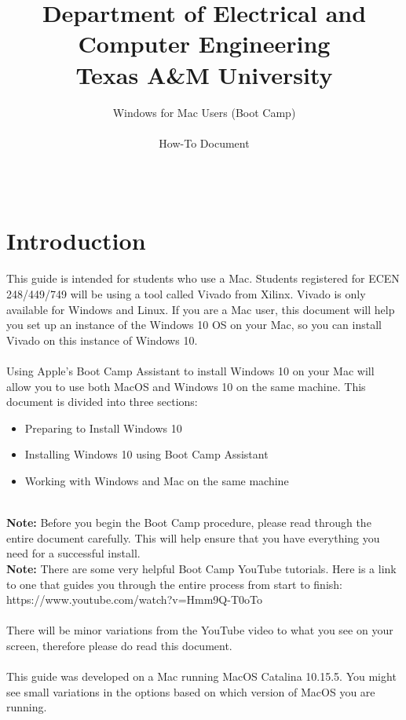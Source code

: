 \documentclass[11pt,twoside,titlepage]{article}
\title{ \huge Department of Electrical and Computer Engineering\\ \huge Texas A\&M University \\}
\author{ \huge Windows for Mac Users (Boot Camp)\\ \\ \huge How-To Document \\ \\ \\ \ta}
\date{}
\begin{document}

\maketitle

\section{Introduction}

This guide is intended for students who use a Mac. Students registered for ECEN 248/449/749 will be using a tool called Vivado from Xilinx. Vivado is only available for Windows and Linux. If you are a Mac user, this document will help you set up an instance of the Windows 10 OS on your Mac, so you can install Vivado on this instance of Windows 10.\\
\\
\noindent
Using Apple's Boot Camp Assistant to install Windows 10 on your Mac will allow you to use both MacOS and Windows 10 on the same machine. This document is divided into three sections: 
\begin{itemize}
    \item Preparing to Install Windows 10
    \item Installing Windows 10 using Boot Camp Assistant
    \item Working with Windows and Mac on the same machine
\end{itemize}

\\

\noindent
\textbf{Note:} Before you begin the Boot Camp procedure, please read through the entire document carefully. This will help ensure that you have everything you need for a successful install.\\

\noindent
\textbf{Note:} There are some very helpful Boot Camp YouTube tutorials. Here is a link to one that guides you through the entire process from start to finish: https://www.youtube.com/watch?v=Hmm9Q-T0oTo
\\
\\
There will be minor variations from the YouTube video to what you see on your screen, therefore please do read this document.\\
\\
This guide was developed on a Mac running MacOS Catalina 10.15.5. You might see small variations in the options based on which version of MacOS you are running.
\end{document}

